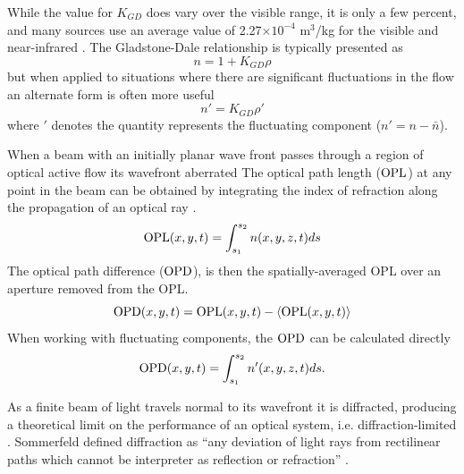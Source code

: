 While the value for $K_{GD}$ does vary over the visible range, it is only a few percent, and many sources use an average value of 2.27$\times10^{-4}$ m$^3$/kg for the visible and near-infrared \cite{Gardiner-1980-reW8xrCb}.
The Gladstone-Dale relationship is typically presented as
\begin{equation}
  n = 1+K_{GD}\rho
  \label{eqn:02_gladstone_dale_relation}
\end{equation}
but when applied to situations where there are significant fluctuations in the flow an alternate form is often more useful
\begin{equation}
  n'=K_{GD}\rho'
  \label{eqn:02_gladstone_dale_relation_fluctuating}
\end{equation}
where $'$ denotes the quantity represents the fluctuating component ($n' = n-\bar{n}$).

When a beam with an initially planar wave front passes through a region of optical active flow its wavefront aberrated
The optical path length ($\operatorname{OPL}$) at any point in the beam can be obtained by integrating the index of refraction along the propagation of an optical ray \cite{Klein-1986-8Vx29RfE}.
\begin{equation}
  \operatorname{OPL} (x,y,t) = \int^{s_2}_{s_1} n(x,y,z,t)ds
  \label{eqn:02_opl}
\end{equation}
The optical path difference ($\operatorname{OPD}$), is then the spatially-averaged $\textrm{OPL}$ over an aperture removed from the OPL.
\begin{equation}
  \operatorname{OPD}(x,y,t) = \operatorname{OPL}(x,y,t)-\langle\operatorname{OPL}(x,y,t)\rangle
  \label{eqn:02_opd}
\end{equation}
When working with fluctuating components, the $\operatorname{OPD}$ can be calculated directly
\begin{equation}
  \operatorname{OPD}(x,y,t) = \int^{s_2}_{s_1} n'(x,y,z,t)ds \textrm{.}
  \label{eqn:02_opd_n}
\end{equation}

As a finite beam of light travels normal to its wavefront it is diffracted, producing a theoretical limit on the performance of an optical system, i.e. diffraction-limited \cite{Born-1965-HHGYgjdH}.
Sommerfeld defined diffraction as ``any deviation of light rays from rectilinear paths which cannot be interpreter as reflection or refraction'' \cite{Sommerfeld-1954-ep2AWrFF}.


